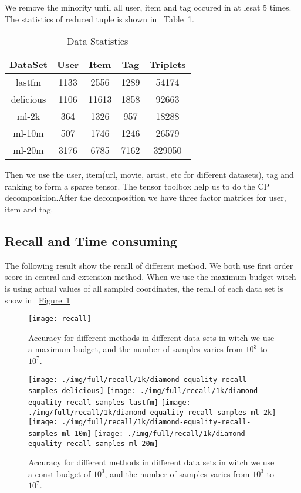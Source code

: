 \documentclass[letterpaper]{article}
\newcommand{\Fig}[1] {\hyperref[fig:#1] {Figure~\ref*{fig:#1}}} %
\newcommand{\Table}[1] {\hyperref[table:#1] {Table~\ref*{table:#1}}} %
\begin{document}
We remove the minority until all user, item and tag occured in at lesat 5 times. The statistics of reduced tuple is shown in ~\Table{Data}.

\begin{table}[t]
  \label{table:Data}
  \centering
  \begin{tabular}{|c|c|c|c|c|}
    \hline
    DataSet & User & Item & Tag & Triplets \\
    \hline
    lastfm      & 1133 &  2556   &  1289  &  54174   \\
    delicious   & 1106 &  11613  &  1858  &  92663   \\
    ml-2k       & 364  &  1326   &  957   &  18288   \\
    ml-10m      & 507  &  1746   &  1246  &  26579   \\
    ml-20m      & 3176 &  6785   &  7162  &  329050  \\
    \hline
  \end{tabular}
  \caption{Data Statistics}
\end{table}

Then we use the user, item(url, movie, artist, etc for different datasets), tag and ranking to form a sparse tensor\cite{TTB_Sparse}. The tensor toolbox\cite{TTB_Software} help us to do the CP decomposition.After the decomposition we have three factor matrices for user, item and tag.

\subsection{Recall and Time consuming}

The following result show the recall of different method. We both use first order score in central and extension method.
When we use the maximum budget witch is using actual values of all sampled coordinates, the recall of each data set is show in ~\Fig{RecallMaxBudget}

\begin{figure}[ht]
  \centering
  \texttt{[image: recall]}\\
  \caption{Accuracy for different methods in different data sets in witch we use a maximum budget, and the number of samples varies from $10^3$ to $10^7$.}
  \label{fig:RecallMaxBudget}
\end{figure}

\begin{figure}[ht]
  \centering
  \texttt{[image: ./img/full/recall/1k/diamond-equality-recall-samples-delicious]}
  \texttt{[image: ./img/full/recall/1k/diamond-equality-recall-samples-lastfm]}
  \texttt{[image: ./img/full/recall/1k/diamond-equality-recall-samples-ml-2k]}
  \texttt{[image: ./img/full/recall/1k/diamond-equality-recall-samples-ml-10m]}
  \texttt{[image: ./img/full/recall/1k/diamond-equality-recall-samples-ml-20m]}\\
  \caption{Accuracy for different methods in different data sets in witch we use a const budget of $10^3$, and the number of samples varies from $10^3$ to $10^7$.}
  \label{fig:Recall1kBudget}
\end{figure}
\end{document}
